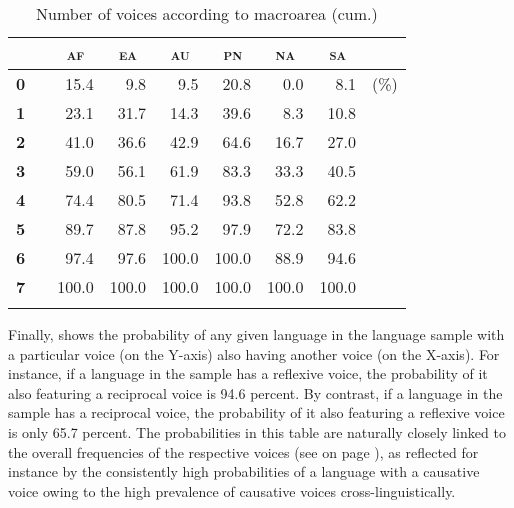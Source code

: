 \begin{table}
	\setlength{\tabcolsep}{3pt}
	\begin{tabularx}{.60\textwidth}{clrrrrrrl}
		\lsptoprule
		& & \multicolumn{1}{c}{\textbf{\textsc{af}}} & \multicolumn{1}{c}{\textbf{\textsc{ea}}} & \multicolumn{1}{c}{\textbf{\textsc{au}}} & \multicolumn{1}{c}{\textbf{\textsc{pn}}} & \multicolumn{1}{c}{\textbf{\textsc{na}}} & \multicolumn{1}{c}{\textbf{\textsc{sa}}} & \\
		\midrule
		\textbf{0} & & 15.4 & 9.8 & 9.5 & 20.8 & 0.0 & 8.1 & (\%) \\
		\textbf{1} & & 23.1 & 31.7 & 14.3 & 39.6 & 8.3 & 10.8 & \\
		\textbf{2} & & 41.0 & 36.6 & 42.9 & 64.6 & 16.7 & 27.0 & \\
		\textbf{3} & & 59.0 & 56.1 & 61.9 & 83.3 & 33.3 & 40.5 & \\
		\textbf{4} & & 74.4 & 80.5 & 71.4 & 93.8 & 52.8 & 62.2 & \\
		\textbf{5} & & 89.7 & 87.8 & 95.2 & 97.9 & 72.2 & 83.8 & \\
		\textbf{6} & & 97.4 & 97.6 & 100.0 & 100.0 & 88.9 & 94.6 & \\
		\textbf{7} & & 100.0 & 100.0 & 100.0 & 100.0 & 100.0 & 100.0 & \\
		\lspbottomrule
	\end{tabularx}
	\caption{Number of voices according to macroarea (cum.)}
	\label{tab:ch6:voice-macroarea-cumulative}
\end{table}

\newpage

Finally,  shows the probability of any given language in the language sample with a particular voice (on the Y-axis) also having another voice (on the X-axis). For instance, if a language in the sample has a reflexive voice, the probability of it also featuring a reciprocal voice is 94.6 percent. By contrast, if a language in the sample has a reciprocal voice, the probability of it also featuring a reflexive voice is only 65.7 percent. The probabilities in this table are naturally closely linked to the overall frequencies of the respective voices (see  on page \pageref{tab:ch6:voice-frequency}), as reflected for instance by the consistently high probabilities of a language with a causative voice owing to the high prevalence of causative voices cross-linguistically. 


